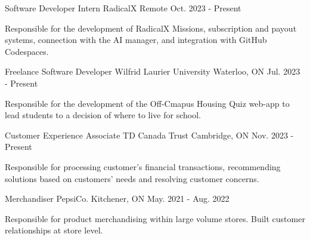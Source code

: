 


\begin{cventries}


\cventry
{Software Developer Intern} %
{RadicalX} %
{Remote} %
{Oct. 2023 - Present} %
{ %
\begin{cvitems}
\item {Responsible for the development of RadicalX Missions, subscription and payout systems, connection with the AI manager, and integration with GitHub Codespaces.}
\end{cvitems}
}


\cventry
{Freelance Software Developer} %
{Wilfrid Laurier University} %
{Waterloo, ON} %
{Jul. 2023 - Present} %
{ %
\begin{cvitems}
\item {Responsible for the development of the Off-Cmapus Housing Quiz web-app to lead students to a decision of where to live for school.}
\end{cvitems}
}

\cventry
{Customer Experience Associate} %
{TD Canada Trust} %
{Cambridge, ON} %
{Nov. 2023 - Present} %
{ %
\begin{cvitems}
\item {Responsible for processing customer's financial transactions, recommending solutions based on customers' needs and resolving customer concerns.}
\end{cvitems}
}

\cventry
{Merchandiser} %
{PepsiCo.} %
{Kitchener, ON} %
{May. 2021 - Aug. 2022} %
{ %
\begin{cvitems}
\item {Responsible for product merchandising within large volume stores. Built customer relationships at store level.}
\end{cvitems}
}


\end{cventries}